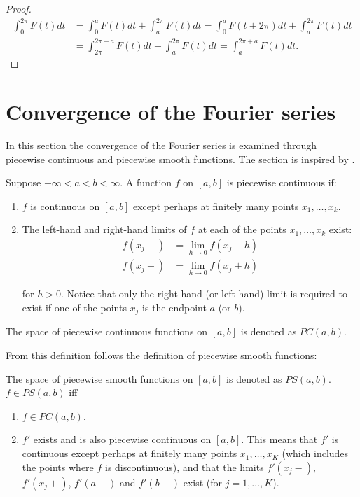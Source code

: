\begin{proof}
\begin{align*}
	\int_0^{2\pi} F(t)dt 
	&= \int_0^a F(t) dt + \int_a^{2\pi} F(t) dt
	= \int_0^a F(t+2\pi)dt + \int_a^{2\pi} F(t) dt\\ 
	&= \int_{2\pi}^{2\pi + a} F(t) dt + \int_a^{2\pi}F(t)dt
	= \int_a^{2\pi+a}F(t)dt.
\end{align*}
\end{proof}

\section{Convergence of the Fourier series}
In this section the convergence of the Fourier series is examined through piecewise continuous and piecewise smooth functions. The section is inspired by \cite{page 31-36, FAA}.

\begin{definition}
Suppose $-\infty < a < b < \infty$. A function $f$ on $[a,b]$ is piecewise continuous if:
\begin{enumerate}
\item $f$ is continuous on $[a,b]$ except perhaps at finitely many points $x_1, \dots, x_k$.
\item The left-hand and right-hand limits of $f$ at each of the points $x_1, \dots, x_k$ exist:
\begin{align*}
f(x_j-) &= \lim_{h\to 0} f(x_j - h) \\
f(x_j+) &= \lim_{h\to 0} f(x_j + h)
\end{align*}

for $h > 0$. Notice that only the right-hand (or left-hand) limit is required to exist if one of the points $x_j$ is the endpoint $a$ (or $b$).
\end{enumerate}

The space of piecewise continuous functions on $[a,b]$ is denoted as $PC(a,b)$.
\end{definition}

From this definition follows the definition of piecewise smooth functions:
\begin{definition}
The space of piecewise smooth functions on $[a,b]$ is denoted as $PS(a,b)$. $f\in PS(a,b)$ iff
\begin{enumerate}
	\item $f \in PC(a,b)$.
	\item $f'$ exists and is also piecewise continuous on $[a,b]$. This means that $f'$ is continuous except perhaps at finitely many points $x_1, \dots, x_K$ (which includes the points where $f$ is discontinuous), and that the limits $f'(x_j-)$, $f'(x_j+)$, $f'(a+)$ and $f'(b-)$ exist (for $j = 1,\dots, K$).
\end{enumerate}
\end{definition}

